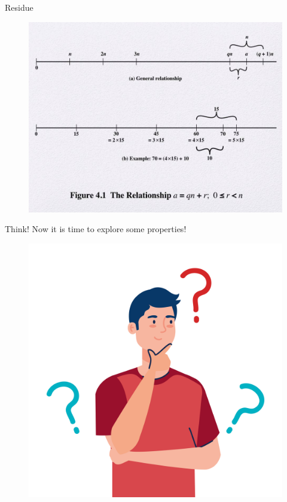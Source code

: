\documentclass{beamer}
\begin{document}
\begin{frame}{Residue}
    \begin{figure}
        \centering
        \includegraphics[scale = 0.28]{residue.jpg}
    \end{figure}
\end{frame}

\begin{frame}{Think!}
    Now it is time to explore some properties!
    \newline
    \newline
    \begin{center}
        \begin{figure}
            \centering
            \includegraphics[scale = 0.3]{think2.jpg}
        \end{figure}
    \end{center}
\end{frame}
\end{document}

